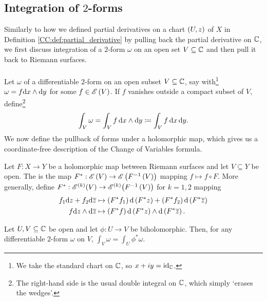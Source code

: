 \documentclass[../Moduli_Spaces_of_Riemann_Surfaces.tex]{subfiles}
\begin{document}
    \subsection{Integration of $2$-forms}
    Similarly to how we defined partial derivatives on a chart $\left(U,z\right)$ of $X$ in Definition \ref{CC:def:partial_derivative} by pulling back the partial derivative on $\mathbb{C}$, we first discuss integration of a $2$-form $\omega$ on an open set $V\subseteq\mathbb{C}$ and then pull it back to Riemann surfaces.\\\ \\
    Let $\omega$ of a differentiable $2$-form on an open subset $V\subseteq\mathbb{C}$, say with\footnote{We take the standard chart on $\mathbb{C}$, so $x+iy=\operatorname{id}_{\mathbb{C}}$.} $\omega=f\mathrm{d} x\wedge\mathrm{d} y$ for some $f\in\mathscr{E}\left(V\right)$. If $f$ vanishes outside a compact subset of $V$, define\footnote{The right-hand side is the usual double integral on $\mathbb{C}$, which simply `erases the wedges'.}
    \begin{equation*}
        \int_V\omega=\int_Vf\,\mathrm{d} x\wedge\mathrm{d} y\coloneqq\int_Vf\,\mathrm{d} x\,\mathrm{d} y.
    \end{equation*}
    We now define the pullback of forms under a holomorphic map, which gives us a coordinate-free description of the Change of Variables formula.
    \begin{definition}
        Let $F:X\to Y$ be a holomorphic map between Riemann surfaces and let $V\subseteq Y$ be open. The  is the map $F^\ast:\mathscr{E}\left(V\right)\to\mathscr{E}\left(F^{-1}\left(V\right)\right)$ mapping $f\mapsto f\circ F$. More generally, define $F^\ast:\mathscr{E}^{\left(k\right)}\!\left(V\right)\to\mathscr{E}^{\left(k\right)}\!\left(F^{-1}\left(V\right)\right)$ for $k=1,2$ mapping
        \begin{equation*}
            \begin{aligned}
                f_1\mathrm{d} z+f_2\mathrm{d}\overline{z}&\mapsto\left(F^\ast f_1\right)\mathrm{d}\left(F^\ast z\right)+\left(F^\ast f_2\right)\mathrm{d}\left(F^\ast\overline{z}\right) \\
                f\mathrm{d} z\wedge\mathrm{d}\overline{z}&\mapsto\left(F^\ast f\right)\mathrm{d}\left(F^\ast z\right)\wedge\mathrm{d}\left(F^\ast\overline{z}\right).
            \end{aligned}
        \end{equation*}
    \end{definition}
    \begin{proposition}\label{CC:prp:change_of_variables_in_C}
        Let $U,V\subseteq\mathbb{C}$ be open and let $\phi:U\to V$ be biholomorphic. Then, for any differentiable $2$-form $\omega$ on $V$, $\int_V\omega=\int_U\phi^\ast\omega$.
    \end{proposition}
\end{document}
